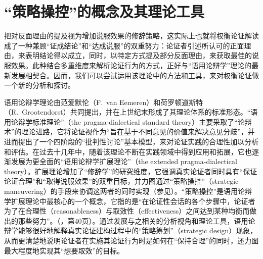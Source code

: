 \documentclass[b5paper,10.5pt,onecolumn,twoside,UTF8]{article}
\begin{document}
\section{“策略操控”的概念及其理论工具}

\vspace{-0.5em}

把对反面理由的提及视为增加说服效果的修辞策略，这实际上也就将权衡论证解读成了一种兼顾“证成结论”和“达成说服”的双重努力：论证者引述所认可的正面理由，来表明结论得以成立，同时，以特定方式提及部分反面理由，来获取最佳的说服效果。此种结合多重维度来解析论证行为的方式，正好与“语用论辩学”理论的最新发展相契合。因而，我们可以尝试运用该理论中的方法和工具，来对权衡论证做一个新的分析和探讨。

语用论辩学理论由范爱默伦（F.~van Eemeren）和荷罗顿道斯特（R.~Grootendorst）共同提出，并在上世纪末形成了其理论体系的标准形态。“语用论辩学标准理论”（the pragma-dialectical standard theory）主要采取了“论辩术”的理论进路，它将论证视作为“旨在基于不同意见的价值来解决意见分歧”，并进而提出了一个四阶段的“批判性讨论”基本模型，来对论证实践的合理性加以分析和评估。在过去十几年中，随着该理论不断在实践领域中得到应用和拓展，它也逐渐发展为更全面的“语用论辩学扩展理论”（the extended pragma-dialectical theory）。扩展理论增加了“修辞学”的研究维度，它强调真实论证者同时具有“保证论证合理”和“取得说服效果”的双重目标，并力图通过“策略操控”（strategic maneuvering）的手段来协调这两者的同时实现（参见\parencite{a15}）。“策略操控”是语用论辩学扩展理论中最核心的一个概念，它指的是“在论证性会话的各个步骤中，论证者为了在合理性（reasonableness）与取效性（effectiveness）之间达到某种均衡而做出的那些努力”。（\parencite{a4}，第40页）。通过发展与之相关的分析视角和理论工具，语用论辩学能够很好地解释真实论证建构过程中的“策略筹划”（strategic design）现象，从而更清楚地说明论证者在实施其论证行为时是如何在“保持合理”的同时，还力图最大程度地实现其“想要取效”的目标。
\end{document}
